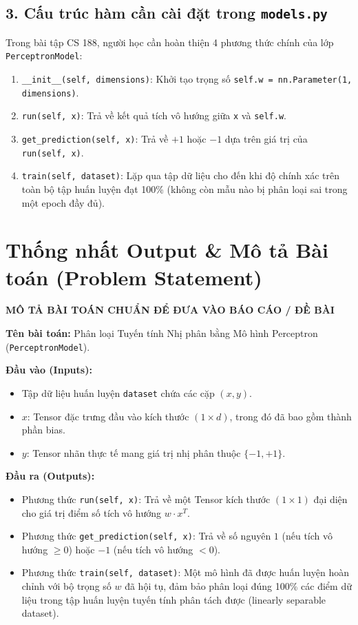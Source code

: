 \documentclass[11pt, a4paper]{article}
\begin{document}
\subsection{3. Cấu trúc hàm cần cài đặt trong \texttt{models.py}}
Trong bài tập CS 188, người học cần hoàn thiện 4 phương thức chính của lớp \texttt{PerceptronModel}:
\begin{enumerate}[itemsep=3pt]
    \item \texttt{\_\_init\_\_(self, dimensions)}: Khởi tạo trọng số \texttt{self.w = nn.Parameter(1, dimensions)}.
    \item \texttt{run(self, x)}: Trả về kết quả tích vô hướng giữa \texttt{x} và \texttt{self.w}.
    \item \texttt{get\_prediction(self, x)}: Trả về $+1$ hoặc $-1$ dựa trên giá trị của \texttt{run(self, x)}.
    \item \texttt{train(self, dataset)}: Lặp qua tập dữ liệu cho đến khi độ chính xác trên toàn bộ tập huấn luyện đạt 100\% (không còn mẫu nào bị phân loại sai trong một epoch đầy đủ).
\end{enumerate}

\section{Thống nhất Output \& Mô tả Bài toán (Problem Statement)}

\begin{mdframed}[style=codeblock]
\textbf{MÔ TẢ BÀI TOÁN CHUẨN ĐỂ ĐƯA VÀO BÁO CÁO / ĐỀ BÀI}

\textbf{Tên bài toán:} Phân loại Tuyến tính Nhị phân bằng Mô hình Perceptron (\texttt{PerceptronModel}).

\textbf{Đầu vào (Inputs):}
\begin{itemize}[itemsep=2pt]
    \item Tập dữ liệu huấn luyện \texttt{dataset} chứa các cặp $(x, y)$.
    \item $x$: Tensor đặc trưng đầu vào kích thước $(1 \times d)$, trong đó đã bao gồm thành phần bias.
    \item $y$: Tensor nhãn thực tế mang giá trị nhị phân thuộc $\{-1, +1\}$.
\end{itemize}

\textbf{Đầu ra (Outputs):}
\begin{itemize}[itemsep=2pt]
    \item Phương thức \texttt{run(self, x)}: Trả về một Tensor kích thước $(1 \times 1)$ đại diện cho giá trị điểm số tích vô hướng $w \cdot x^T$.
    \item Phương thức \texttt{get\_prediction(self, x)}: Trả về số nguyên $1$ (nếu tích vô hướng $\ge 0$) hoặc $-1$ (nếu tích vô hướng $< 0$).
    \item Phương thức \texttt{train(self, dataset)}: Một mô hình đã được huấn luyện hoàn chỉnh với bộ trọng số $w$ đã hội tụ, đảm bảo phân loại đúng 100\% các điểm dữ liệu trong tập huấn luyện tuyến tính phân tách được (linearly separable dataset).
\end{itemize}
\end{mdframed}
\end{document}
